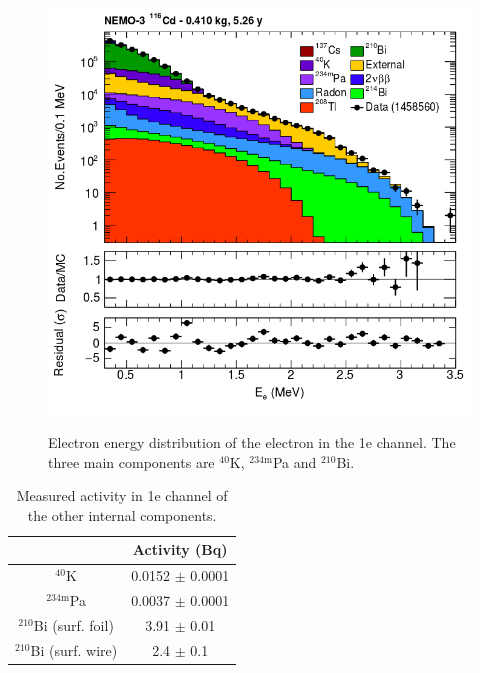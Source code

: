 \documentclass[main.tex]{subfiles}
\begin{document}
\begin{figure}[h!]
\centering
\includegraphics[scale=0.40]{pictures/Chap6/1eChannelEe.png}
\label{1eChannel_Ee}
\caption{Electron energy distribution of the electron in the 1e channel. The three main components are $^{\text{40}}$K, $^{\text{234m}}$Pa and $^{\text{210}}$Bi.}
\end{figure}



\begin{table}
\centering
\begin{tabular}{c|c}
 & Activity (Bq) \\
\midrule
$^{\text{40}}$K                 & 0.0152 $\pm$ 0.0001 \\
$^{\text{234m}}$Pa              & 0.0037 $\pm$ 0.0001 \\
$^{\text{210}}$Bi (surf. foil)  & 3.91   $\pm$ 0.01   \\
$^{\text{210}}$Bi (surf. wire)  & 2.4    $\pm$ 0.1    \\
\bottomrule
\end{tabular}
\caption{Measured activity in 1e channel of the other internal components. }
\label{Table1e-activityMeasurement}
\end{table}



\FloatBarrier
\end{document}
